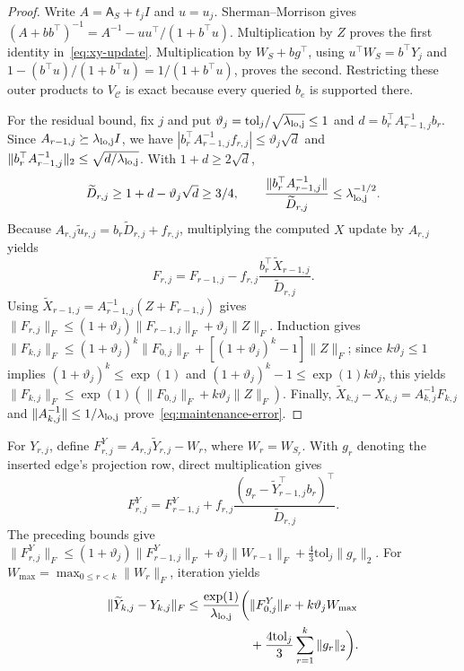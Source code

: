 \documentclass[conference]{IEEEtran}
\theoremstyle{definition}
\newcommand{\matA}{\mathsf A}
\begin{document}
\begin{proof}
Write $A=\matA_S+t_jI$ and $u=u_j$. Sherman--Morrison gives
$(A+bb^\top)^{-1}=A^{-1}-uu^\top/(1+b^\top u)$.
Multiplication by $Z$ proves the first identity in~\eqref{eq:xy-update}. Multiplication by $W_S+bg^\top$, using $u^\top W_S=b^\top Y_j$ and
$1-(b^\top u)/(1+b^\top u)=1/(1+b^\top u)$, proves the second. Restricting these outer products to $V_{\mathcal C}$ is exact because every queried $b_e$ is supported there.

For the residual bound, fix $j$ and put
$\vartheta_j=\mathrm{tol}_j/\sqrt{\lambda_{\rm lo,j}}\le1$ and
$d=b_r^\top A_{r-1,j}^{-1}b_r$. Since $A_{r-1,j}\succeq\lambda_{\rm lo,j}I$, we have
$|b_r^\top A_{r-1,j}^{-1}f_{r,j}|\le\vartheta_j\sqrt d$ and
$\|b_r^\top A_{r-1,j}^{-1}\|_2\le\sqrt{d/\lambda_{\rm lo,j}}$. With $1+d\ge2\sqrt d$,
\[
\widetilde D_{r,j}\ge1+d-\vartheta_j\sqrt d\ge3/4,\qquad
\frac{\|b_r^\top A_{r-1,j}^{-1}\|}{\widetilde D_{r,j}}
\le \lambda_{\rm lo,j}^{-1/2}.
\]
Because $A_{r,j}\widetilde u_{r,j}=b_r\widetilde D_{r,j}+f_{r,j}$, multiplying the computed $X$ update by $A_{r,j}$ yields
\[
F_{r,j}=F_{r-1,j}-f_{r,j}
       \frac{b_r^\top\widetilde X_{r-1,j}}{\widetilde D_{r,j}}.
\]
Using $\widetilde X_{r-1,j}=A_{r-1,j}^{-1}(Z+F_{r-1,j})$ gives
$\|F_{r,j}\|_F\le(1+\vartheta_j)\|F_{r-1,j}\|_F+
\vartheta_j\|Z\|_F$. Induction gives $\|F_{k,j}\|_F\le(1+\vartheta_j)^k\|F_{0,j}\|_F+[(1+\vartheta_j)^k-1]\|Z\|_F$; since $k\vartheta_j\le1$ implies $(1+\vartheta_j)^k\le\exp(1)$ and $(1+\vartheta_j)^k-1\le\exp(1)k\vartheta_j$, this yields
$\|F_{k,j}\|_F\le\exp(1)(\|F_{0,j}\|_F+k\vartheta_j\|Z\|_F)$.
Finally, $\widetilde X_{k,j}-X_{k,j}=A_{k,j}^{-1}F_{k,j}$
and $\|A_{k,j}^{-1}\|\le1/\lambda_{\rm lo,j}$ prove~\eqref{eq:maintenance-error}.
\end{proof}



For $Y_{r,j}$, define $F_{r,j}^Y=A_{r,j}\widetilde Y_{r,j}-W_r$,
where $W_r=W_{S_r}$. With $g_r$ denoting the inserted edge's
projection row, direct multiplication gives
\[
F_{r,j}^Y=F_{r-1,j}^Y+f_{r,j}
\frac{(g_r-\widetilde Y_{r-1,j}^\top b_r)^\top}{\widetilde D_{r,j}}.
\]
The preceding bounds give
$\|F_{r,j}^Y\|_F\le(1+\vartheta_j)\|F_{r-1,j}^Y\|_F+
\vartheta_j\|W_{r-1}\|_F+\tfrac43\mathrm{tol}_j\|g_r\|_2$.
For $W_{\max}=\max_{0\le r<k}\|W_r\|_F$, iteration yields
\[
\begin{aligned}
\|\widetilde Y_{k,j}-Y_{k,j}\|_F
\le\frac{\exp(1)}{\lambda_{\rm lo,j}}\biggl(&\|F_{0,j}^Y\|_F+k\vartheta_jW_{\max}\\
&+\frac{4\mathrm{tol}_j}{3}\sum_{r=1}^k\|g_r\|_2\biggr).
\end{aligned}
\]
\end{document}
